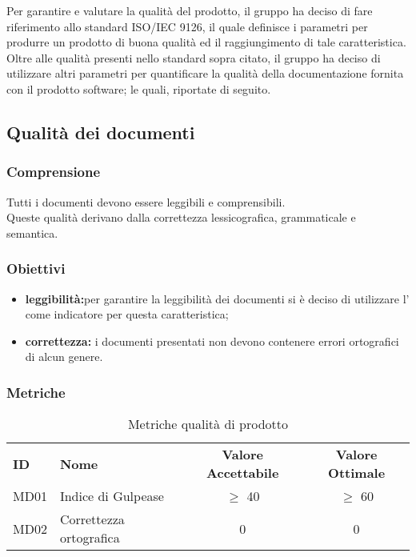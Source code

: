 Per garantire e valutare la qualità del prodotto, il gruppo ha deciso di fare riferimento allo standard ISO/IEC 9126, il quale definisce i parametri per produrre un prodotto di buona qualità ed il raggiungimento di tale caratteristica. \\
Oltre alle qualità presenti nello standard sopra citato, il gruppo ha deciso di utilizzare altri parametri per quantificare la qualità della documentazione fornita con il prodotto software; le quali, riportate di seguito.

\subsection{Qualità dei documenti}

\subsubsection{Comprensione}
Tutti i documenti devono essere leggibili e comprensibili.\\
Queste qualità derivano dalla correttezza lessicografica, grammaticale e semantica.

\subsubsection{Obiettivi}
\begin{itemize}
    \item \textbf{leggibilità:}per garantire la leggibilità dei documenti si è deciso di utilizzare l' come indicatore per questa caratteristica;
    \item \textbf{correttezza:} i documenti presentati non devono contenere errori ortografici di alcun genere.
\end{itemize}

\subsubsection{Metriche}

\begin{table} [h!]
	\begin{center}
		\begin{tabular} {m{2 cm} m{7 cm} c c }
			\rowcolor{lightgray}
			\textbf{ID} & \textbf{Nome}& \textbf{Valore Accettabile} & \textbf{Valore Ottimale}\\
			MD01 & Indice di Gulpease  		 & $\geq$ 40   			& $\geq$ 60 \\
			MD02 & Correttezza ortografica 				&0						&0
		\end{tabular}
	\caption{Metriche qualità di prodotto}
	\end{center}
\end{table}